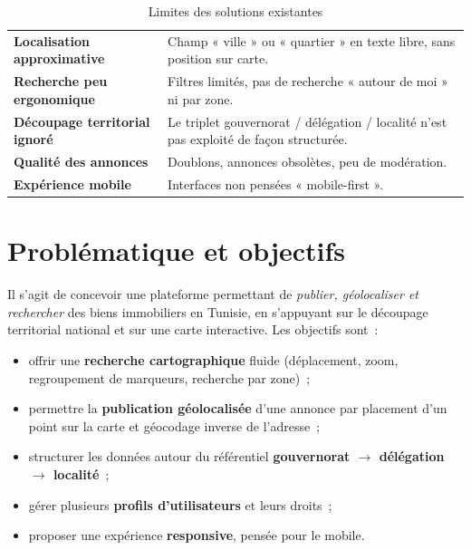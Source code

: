 \begin{table}[H]
\centering
\renewcommand{\arraystretch}{1.25}
\begin{tabularx}{\linewidth}{>{\bfseries}p{4.2cm} X}
\toprule
Localisation approximative & Champ « ville » ou « quartier » en texte libre, sans position sur carte. \\
Recherche peu ergonomique  & Filtres limités, pas de recherche « autour de moi » ni par zone. \\
Découpage territorial ignoré & Le triplet gouvernorat / délégation / localité n'est pas exploité de façon structurée. \\
Qualité des annonces        & Doublons, annonces obsolètes, peu de modération. \\
Expérience mobile           & Interfaces non pensées « mobile-first ». \\
\bottomrule
\end{tabularx}
\caption{Limites des solutions existantes}
\label{tab:limites-existant}
\end{table}

\section{Problématique et objectifs}
\label{sec:problematique}

Il s'agit de concevoir une plateforme permettant de \emph{publier, géolocaliser
et rechercher} des biens immobiliers en Tunisie, en s'appuyant sur le découpage
territorial national et sur une carte interactive. Les objectifs sont~:

\begin{itemize}[label=\textbullet,itemsep=1pt]
  \item offrir une \textbf{recherche cartographique} fluide (déplacement, zoom,
        regroupement de marqueurs, recherche par zone)~;
  \item permettre la \textbf{publication géolocalisée} d'une annonce par
        placement d'un point sur la carte et géocodage inverse de l'adresse~;
  \item structurer les données autour du référentiel
        \textbf{gouvernorat $\rightarrow$ délégation $\rightarrow$ localité}~;
  \item gérer plusieurs \textbf{profils d'utilisateurs} et leurs droits~;
  \item proposer une expérience \textbf{responsive}, pensée pour le mobile.
\end{itemize}

